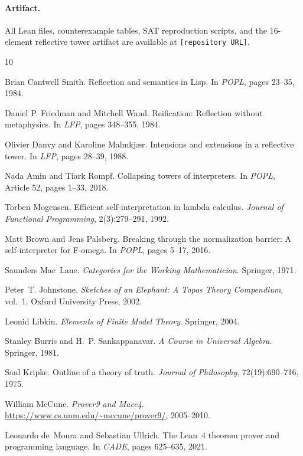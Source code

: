 \documentclass[a4paper,UKenglish,cleveref,autoref,thm-restate]{lipics-v2021}
\begin{document}
\paragraph{Artifact.}
All Lean files, counterexample tables, SAT reproduction scripts, and the 16-element reflective tower artifact are available at \texttt{[repository URL]}.




\begin{thebibliography}{10}

Brian Cantwell Smith.
\newblock Reflection and semantics in {Lisp}.
\newblock In \emph{POPL}, pages 23--35, 1984.

Daniel P. Friedman and Mitchell Wand.
\newblock Reification: Reflection without metaphysics.
\newblock In \emph{LFP}, pages 348--355, 1984.

Olivier Danvy and Karoline Malmkj{\ae}r.
\newblock Intensions and extensions in a reflective tower.
\newblock In \emph{LFP}, pages 28--39, 1988.

Nada Amin and Tiark Rompf.
\newblock Collapsing towers of interpreters.
\newblock In \emph{POPL}, Article 52, pages 1--33, 2018.

Torben Mogensen.
\newblock Efficient self-interpretation in lambda calculus.
\newblock \emph{Journal of Functional Programming}, 2(3):279--291, 1992.

Matt Brown and Jens Palsberg.
\newblock Breaking through the normalization barrier: A self-interpreter for {F-omega}.
\newblock In \emph{POPL}, pages 5--17, 2016.

Saunders Mac~Lane.
\newblock \emph{Categories for the Working Mathematician}.
\newblock Springer, 1971.

Peter~T. Johnstone.
\newblock \emph{Sketches of an Elephant: A Topos Theory Compendium}, vol.~1.
\newblock Oxford University Press, 2002.

Leonid Libkin.
\newblock \emph{Elements of Finite Model Theory}.
\newblock Springer, 2004.

Stanley Burris and H.~P. Sankappanavar.
\newblock \emph{A Course in Universal Algebra}.
\newblock Springer, 1981.

Saul Kripke.
\newblock Outline of a theory of truth.
\newblock \emph{Journal of Philosophy}, 72(19):690--716, 1975.


William McCune.
\newblock \emph{Prover9 and Mace4}.
\newblock \url{https://www.cs.unm.edu/~mccune/prover9/}, 2005--2010.

Leonardo de~Moura and Sebastian Ullrich.
\newblock The {Lean}~4 theorem prover and programming language.
\newblock In \emph{CADE}, pages 625--635, 2021.

\end{thebibliography}
\end{document}
